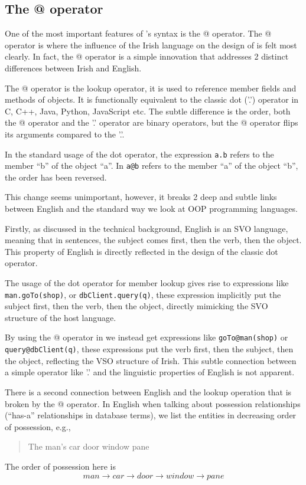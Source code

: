 \subsection{The @ operator}\label{atoperator}

One of the most important features of \Setanta{}'s syntax is the @ operator. The @ operator is where the influence of the Irish language on the design of \Setanta{} is felt most clearly. In fact, the @ operator is a simple innovation that addresses 2 distinct differences between Irish and English.

The @ operator is the lookup operator, it is used to reference member fields and methods of objects. It is functionally equivalent to the classic dot ('.') operator in C, C++, Java, Python, JavaScript etc. The subtle difference is the order, both the @ operator and the '.' operator are binary operators, but the @ operator flips its arguments compared to the '.'.

In the standard usage of the dot operator, the expression \verb|a.b| refers to the member ``b'' of the object ``a''. In \Setanta{} \verb|a@b| refers to the member ``a'' of the object ``b'', the order has been reversed.

This change seems unimportant, however, it breaks 2 deep and subtle links between English and the standard way we look at OOP programming languages.

Firstly, as discussed in the technical background, English is an SVO language, meaning that in sentences, the subject comes first, then the verb, then the object. This property of English is directly reflected in the design of the classic dot operator.

The usage of the dot operator for member lookup gives rise to expressions like \verb|man.goTo(shop)|, or \verb|dbClient.query(q)|, these expression implicitly put the subject first, then the verb, then the object, directly mimicking the SVO structure of the host language.

By using the @ operator in \Setanta{} we instead get expressions like \verb|goTo@man(shop)| or\\
\verb|query@dbClient(q)|, these expressions put the verb first, then the subject, then the object, reflecting the VSO structure of Irish. This subtle connection between a simple operator like '.' and the linguistic properties of English is not apparent.

There is a second connection between English and the lookup operation that is broken by the @ operator. In English when talking about possession relationships (``has-a'' relationships in database terms), we list the entities in decreasing order of possession, e.g.,
\begin{quote}
    The man's car door window pane
\end{quote}
The order of possession here is
\[man \rightarrow car \rightarrow door \rightarrow window \rightarrow pane\]

